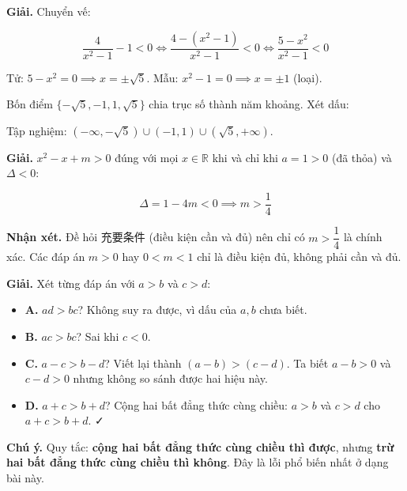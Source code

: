 \documentclass[11pt, a4paper]{article}
\begin{document}
\begin{dapan}[22 — Đáp án B]
\textbf{Giải.} Chuyển vế:

$$\frac{4}{x^2-1} - 1 < 0 \iff \frac{4 - (x^2-1)}{x^2-1} < 0 \iff \frac{5 - x^2}{x^2-1} < 0$$

Tử: $5 - x^2 = 0 \implies x = \pm\sqrt{5}$. Mẫu: $x^2 - 1 = 0 \implies x = \pm 1$ (loại).

Bốn điểm $\{-\sqrt{5}, -1, 1, \sqrt{5}\}$ chia trục số thành năm khoảng. Xét dấu:


Tập nghiệm: $(-\infty, -\sqrt{5}) \cup (-1, 1) \cup (\sqrt{5}, +\infty)$.
\end{dapan}

\begin{dapan}[23 — Đáp án A]
\textbf{Giải.} $x^2 - x + m > 0$ đúng với mọi $x \in \mathbb{R}$ khi và chỉ khi $a = 1 > 0$ (đã thỏa) và $\Delta < 0$:

$$\Delta = 1 - 4m < 0 \implies m > \frac{1}{4}$$

\textbf{Nhận xét.} Đề hỏi 充要条件 (điều kiện cần và đủ) nên chỉ có $m > \dfrac{1}{4}$ là chính xác. Các đáp án $m > 0$ hay $0 < m < 1$ chỉ là điều kiện đủ, không phải cần và đủ.
\end{dapan}

\begin{dapan}[24 — Đáp án D]
\textbf{Giải.} Xét từng đáp án với $a > b$ và $c > d$:

\begin{itemize}[leftmargin=1.4em, itemsep=2pt]
\item \textbf{A.} $ad > bc$? Không suy ra được, vì dấu của $a, b$ chưa biết.
\item \textbf{B.} $ac > bc$? Sai khi $c < 0$.
\item \textbf{C.} $a - c > b - d$? Viết lại thành $(a-b) > (c-d)$. Ta biết $a - b > 0$ và $c - d > 0$ nhưng không so sánh được hai hiệu này.
\item \textbf{D.} $a + c > b + d$? Cộng hai bất đẳng thức cùng chiều: $a > b$ và $c > d$ cho $a + c > b + d$. ✓
\end{itemize}


\textbf{Chú ý.} Quy tắc: \textbf{cộng hai bất đẳng thức cùng chiều thì được}, nhưng \textbf{trừ hai bất đẳng thức cùng chiều thì không}. Đây là lỗi phổ biến nhất ở dạng bài này.
\end{dapan}
\end{document}
